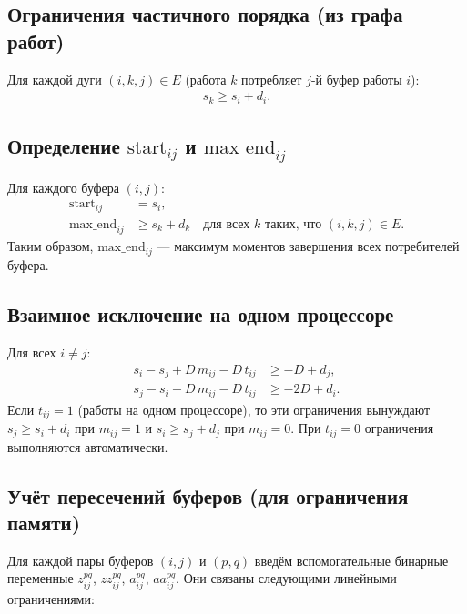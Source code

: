\subsection*{Ограничения частичного порядка (из графа работ)}

Для каждой дуги $(i,k,j)\in E$ (работа $k$ потребляет $j$-й буфер работы $i$):
\begin{align}
	s_k \ge s_i + d_i. \label{eq:prec}
\end{align}

\subsection*{Определение $\text{start}_{ij}$ и $\text{max\_end}_{ij}$}

Для каждого буфера $(i,j)$:
\begin{align}
	\text{start}_{ij} &= s_i, \label{eq:start_def}\\
	\text{max\_end}_{ij} &\ge s_k + d_k \quad \text{для всех } k \text{ таких, что } (i,k,j)\in E. \label{eq:max_end_def}
\end{align}
Таким образом, $\text{max\_end}_{ij}$ — максимум моментов завершения всех потребителей буфера.

\subsection*{Взаимное исключение на одном процессоре}

Для всех $i\neq j$:
\begin{align}
	s_i - s_j + D\,m_{ij} - D\,t_{ij} &\ge -D + d_j, \label{eq:no_conflict1}\\
	s_j - s_i - D\,m_{ij} - D\,t_{ij} &\ge -2D + d_i. \label{eq:no_conflict2}
\end{align}
Если $t_{ij}=1$ (работы на одном процессоре), то эти ограничения вынуждают $s_j \ge s_i + d_i$ при $m_{ij}=1$ и $s_i \ge s_j + d_j$ при $m_{ij}=0$. При $t_{ij}=0$ ограничения выполняются автоматически.

\subsection*{Учёт пересечений буферов (для ограничения памяти)}

Для каждой пары буферов \((i,j)\) и \((p,q)\) введём вспомогательные бинарные переменные \(z_{ij}^{pq}\), \(zz_{ij}^{pq}\), \(a_{ij}^{pq}\), \(aa_{ij}^{pq}\). Они связаны следующими линейными ограничениями:

